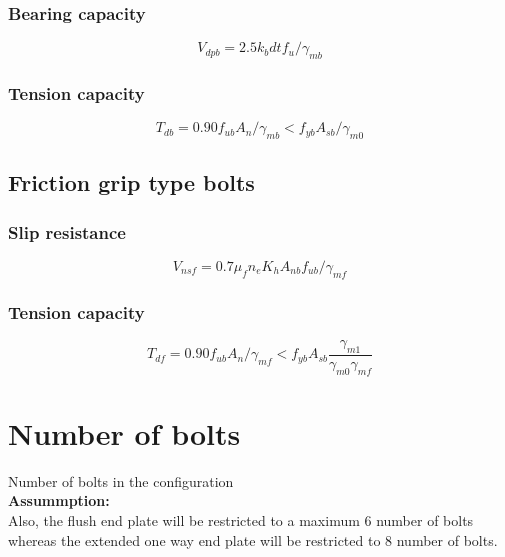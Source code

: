 \documentclass[11.5pt,a4paper,oneside]{report}
\begin{document}
\begin{Form}
\subsubsection{Bearing capacity}
\begin{equation}
V_{dpb} = 2.5 k_b d t f_u / \gamma_{mb}
\end{equation}
\subsubsection{Tension capacity}
\begin{equation}
T_{db} = 0.90 f_{ub} A_n / \gamma_{mb} < f_{yb} A_{sb} / \gamma_{m0}
\end{equation}
\subsection{Friction grip type bolts}
\subsubsection{Slip resistance}
\begin{equation}
V_{nsf} = 0.7 \mu_f n_e  K_h A_{nb} f_{ub} / \gamma_{mf}
\end{equation}
\subsubsection{Tension capacity}
\begin{equation}
T_{df} = 0.90 f_{ub} A_n / \gamma_{mf} < f_{yb} A_{sb}  \frac{\gamma_{m1}}{\gamma_{m0} \gamma_{mf}}
\end{equation}
\section{Number of bolts}
\large Number of bolts in the configuration \\
	
	\textbf{Assummption:} \\
	
	Also, the flush end plate will be restricted to a maximum 6 number of bolts whereas the extended one way end plate will be restricted to 8 number of bolts.
	

\end{Form}
\end{document}
